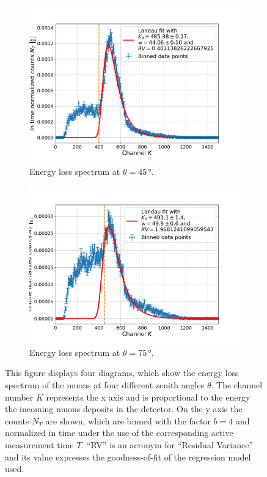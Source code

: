 \begin{figure}[H]
\begin{subfigure}[t]{0.495\textwidth}
		\label{EnergySpectrumAt30Degrees}
	\end{subfigure}
	\begin{subfigure}[t]{0.495\textwidth}
		\centering
		\includegraphics[width=\textwidth]{src/EnergySpectrumAt45Degrees}
		\caption{Energy loss spectrum at $\theta =45\,$°.}
		\label{EnergySpectrumAt45Degrees}
	\end{subfigure}
	\begin{subfigure}[t]{0.495\textwidth}
		\centering
		\includegraphics[width=\textwidth]{src/EnergySpectrumAt75Degrees}
		\caption{Energy loss spectrum at $\theta =75\,$°.}
		\label{EnergySpectrumAt75Degrees}
	\end{subfigure}
	\caption{This figure displays four diagrams, which show the energy loss spectrum of the muons at four different zenith angles $\theta$. The channel number $K$ represents the x axis and is proportional to the energy the incoming muons deposits in the detector. On the y axis the counts $N_T$ are shown, which are binned with the factor $b=4$ and normalized in time under the use of the corresponding active measurement time $T$. \enquote{RV} is an acronym for \enquote{Residual Variance} and its value expresses the goodness-of-fit of the regression model used.}
	\label{EnergySpectrum}
\end{figure}
